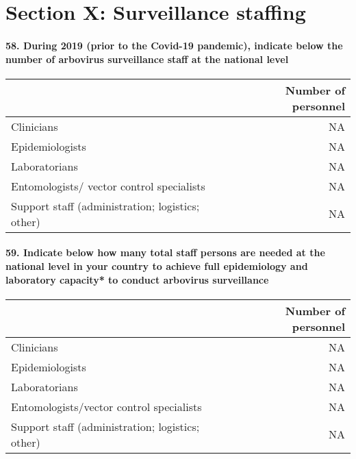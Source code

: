 \documentclass[
]{article}
\begin{document}
\hypertarget{section-x-surveillance-staffing}{%
\section{Section X: Surveillance
staffing}\label{section-x-surveillance-staffing}}

\hypertarget{during-2019-prior-to-the-covid-19-pandemic-indicate-below-the-number-of-arbovirus-surveillance-staff-at-the-national-level}{%
\paragraph{58. During 2019 (prior to the Covid-19 pandemic), indicate
below the number of arbovirus surveillance staff at the national
level}\label{during-2019-prior-to-the-covid-19-pandemic-indicate-below-the-number-of-arbovirus-surveillance-staff-at-the-national-level}}

\begin{longtable}[]{@{}lr@{}}
\toprule
& Number of personnel \\
\midrule
\endhead
Clinicians & NA \\
Epidemiologists & NA \\
Laboratorians & NA \\
Entomologists/ vector control specialists & NA \\
Support staff (administration; logistics; other) & NA \\
\bottomrule
\end{longtable}

\hypertarget{indicate-below-how-many-total-staff-persons-are-needed-at-the-national-level-in-your-country-to-achieve-full-epidemiology-and-laboratory-capacity-to-conduct-arbovirus-surveillance}{%
\paragraph{59. Indicate below how many total staff persons are needed at
the national level in your country to achieve full epidemiology and
laboratory capacity* to conduct arbovirus
surveillance}\label{indicate-below-how-many-total-staff-persons-are-needed-at-the-national-level-in-your-country-to-achieve-full-epidemiology-and-laboratory-capacity-to-conduct-arbovirus-surveillance}}

\begin{longtable}[]{@{}lr@{}}
\toprule
& Number of personnel \\
\midrule
\endhead
Clinicians & NA \\
Epidemiologists & NA \\
Laboratorians & NA \\
Entomologists/vector control specialists & NA \\
Support staff (administration; logistics; other) & NA \\
\bottomrule
\end{longtable}
\end{document}
